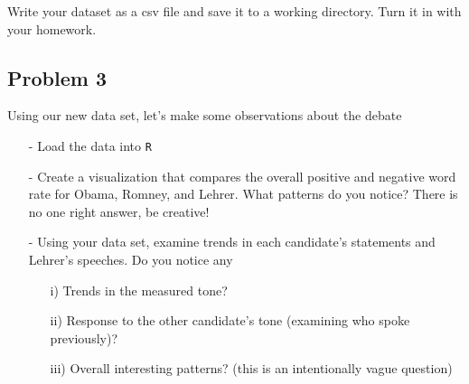 \documentclass[12pt,letterpaper]{article}
\begin{document}
Write your dataset as a csv file and save it to a working directory. Turn it in with your homework.


\subsection*{Problem 3}

Using our new data set, let's make some observations about the debate
\begin{itemize}
\item[-] Load the data into {\tt R}
\item[-] Create a visualization that compares the overall positive and negative word rate for Obama, Romney, and Lehrer.  What patterns do you notice?  There is no one right answer, be creative!
\item[-] Using your data set, examine trends in each candidate's statements and Lehrer's speeches.  Do you notice any
\begin{itemize}
\item[i)] Trends in the measured tone?
\item[ii)] Response to the other candidate's tone (examining who spoke previously)?
\item[iii)] Overall interesting patterns? (this is an intentionally vague question)
\end{itemize}
\end{itemize}
\end{document}

